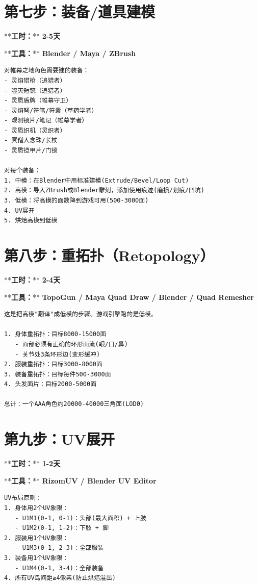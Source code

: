 \documentclass[12pt,a4paper,openany]{ctexbook}
\begin{document}
\section*{第七步：装备/道具建模}


**\textbf{工时：}**\textbf{ 2-5天}

**\textbf{工具：}**\textbf{ Blender / Maya / ZBrush}


\begin{verbatim}
对帷幕之地角色需要建的装备：
- 灵焰猎枪（追猎者）
- 噬灭短铳（追猎者）
- 灵质盾牌（帷幕守卫）
- 灵焰弩/符笔/符囊（草药学者）
- 观测镜片/笔记（帷幕学者）
- 灵质织机（灵织者）
- 冥僧人念珠/长杖
- 灵质铠甲片/门锁

对每个装备：
1. 中模：在Blender中用标准建模(Extrude/Bevel/Loop Cut)
2. 高模：导入ZBrush或Blender雕刻，添加使用痕迹(磨损/划痕/凹坑)
3. 低模：将高模的面数降到游戏可用(500-3000面)
4. UV展开
5. 烘焙高模到低模
\end{verbatim}


\section*{第八步：重拓扑（Retopology）}


**\textbf{工时：}**\textbf{ 2-4天}

**\textbf{工具：}**\textbf{ TopoGun / Maya Quad Draw / Blender / Quad Remesher}


\begin{verbatim}
这是把高模"翻译"成低模的步骤。游戏引擎跑的是低模。

1. 身体重拓扑：目标8000-15000面
   - 面部必须有正确的环形面流(眼/口/鼻)
   - 关节处3条环形边(变形缓冲)
2. 服装重拓扑：目标3000-8000面
3. 装备重拓扑：目标每件500-3000面
4. 头发面片：目标2000-5000面

总计：一个AAA角色约20000-40000三角面(LOD0)
\end{verbatim}


\section*{第九步：UV展开}


**\textbf{工时：}**\textbf{ 1-2天}

**\textbf{工具：}**\textbf{ RizomUV / Blender UV Editor}


\begin{verbatim}
UV布局原则：
1. 身体用2个UV象限：
   - U1M1(0-1, 0-1)：头部(最大面积) + 上肢
   - U1M2(0-1, 1-2)：下肢 + 脚
2. 服装用1个UV象限：
   - U1M3(0-1, 2-3)：全部服装
3. 装备用1个UV象限：
   - U1M4(0-1, 3-4)：全部装备
4. 所有UV岛间距≥4像素(防止烘焙溢出)
\end{verbatim}
\end{document}
